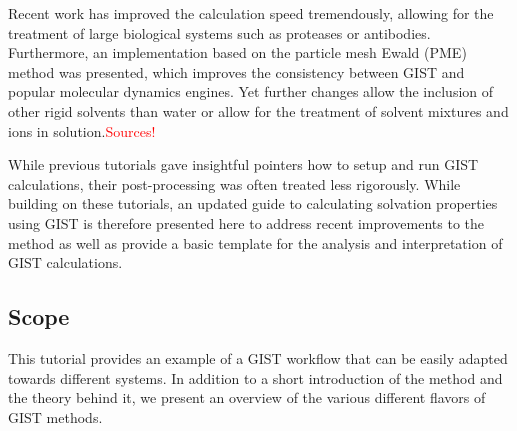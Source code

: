 \documentclass[9pt,tutorial]{livecoms}
\newcommand{\todo}{\textcolor{red}}
\begin{document}
Recent work has improved the calculation speed tremendously, allowing for the treatment of large biological systems such as proteases or antibodies.
Furthermore, an implementation based on the particle mesh Ewald (PME) \cite{Darden1993-pme} method was presented, which improves the consistency between GIST and popular molecular dynamics engines. 
Yet further changes allow the inclusion of other rigid solvents than water or allow for the treatment of solvent mixtures and ions in solution.\todo{Sources!}

While previous tutorials gave insightful pointers how to setup and run GIST calculations, their post-processing was often treated less rigorously. While building on these tutorials, an updated guide to calculating solvation properties using GIST is therefore presented here to address recent improvements to the method as well as provide a basic template for the analysis and interpretation of GIST calculations.

%
%
%

\subsection{Scope}

This tutorial provides an example of a GIST workflow that can be easily adapted towards different systems. 
In addition to a short introduction of the method and the theory behind it, we present an overview of the various different flavors of GIST methods.
\end{document}
